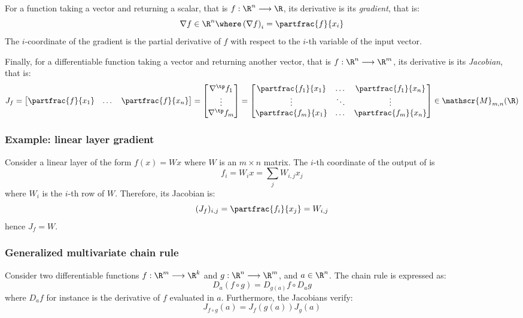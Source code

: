 For a function taking a vector and returning a scalar, that is $f:\R^n\longrightarrow\R$, its derivative is its \emph{gradient}, that is:
\begin{equation*}
    \nabla f\in\R^n \where \left(\nabla f\right)_i = \partfrac{f}{x_i}
\end{equation*}
The $i$-coordinate of the gradient is the partial derivative of $f$ with respect to the $i$-th variable of the input vector.

Finally, for a differentiable function taking a vector and returning another vector, that is $f:\R^n\longrightarrow\R^m$, its derivative is its \emph{Jacobian}, that is:
\begin{equation*}
    J_f 
    = \begin{bmatrix} \partfrac{f}{x_1} & \dots & \partfrac{f}{x_n}\end{bmatrix} 
    = \begin{bmatrix} 
        \nabla^\tp f_1\\ 
        \vdots\\ 
        \nabla^\tp f_m
    \end{bmatrix}
    = \begin{bmatrix}
        \partfrac{f_1}{x_1} & \dots & \partfrac{f_1}{x_n}\\
        \vdots & \ddots & \vdots\\
        \partfrac{f_m}{x_1} & \dots & \partfrac{f_m}{x_n}
    \end{bmatrix}
    \in\mathscr{M}_{m, n}(\R)
\end{equation*}

\subsubsection{Example: linear layer gradient}
Consider a linear layer of the form $f(x)=Wx$ where $W$ is an $m\times n$ matrix. The $i$-th coordinate of the output of is
\begin{equation*}
    f_i = W_ix=\sum_j W_{i,j}x_j
\end{equation*}
where $W_i$ is the $i$-th row of $W$. Therefore, its Jacobian is:
\begin{equation*}
    (J_f)_{i, j} = \partfrac{f_i}{x_j} = W_{i, j}
\end{equation*}
hence $J_f=W$.

\subsubsection{Generalized multivariate chain rule}
Consider two differentiable functions $f:\R^m\longrightarrow\R^k$ and $g:\R^n\longrightarrow\R^m$, and $a\in\R^n$. The chain rule is expressed as:
\begin{equation}
    D_a(f\circ g) = D_{g(a)}f\circ D_ag
\end{equation}
where $D_af$ for instance is the derivative of $f$ evaluated in $a$. Furthermore, the Jacobians verify:
\begin{equation}
    J_{f\circ g}(a)=J_f(g(a)) J_g(a)
\end{equation}